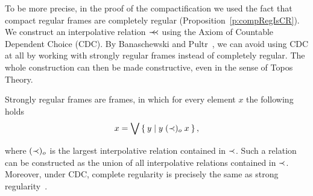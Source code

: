 To be more precise, in the proof of the compactification we used the fact that compact regular frames are completely regular (Proposition~\ref{p:compRegIsCR}).
We construct an interpolative relation $\prec\mkern-7mu\prec$ using the Axiom of Countable Dependent Choice (CDC). By Banaschewski and Pultr~\cite{banaschewski2002constructive}, we can avoid using CDC at all by working with strongly regular frames instead of completely regular. The whole construction can then be made constructive, even in the sense of Topos Theory.

Strongly regular frames are frames, in which for every element $x$ the following holds
$$ x = \bigvee \Set{ y | y\;(\prec)_o\;x }, $$

\noindent where $(\prec)_o$ is the largest interpolative relation contained in $\prec$. Such a relation can be constructed as the union of all interpolative relations contained in $\prec$. Moreover, under CDC, complete regularity is precisely the same as strong regularity~\cite{banaschewski2002constructive}.
